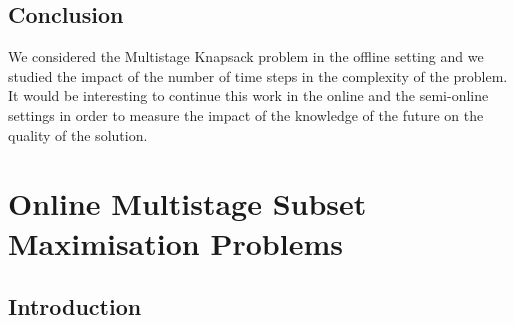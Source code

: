 \documentclass[a4paper]{book}
\begin{document}
\section{Conclusion}
We considered the {\sc Multistage Knapsack} problem in the offline setting and we studied the impact of the number of time steps in the complexity of the problem. It would be interesting to continue this work in the online and the semi-online settings in order to measure the impact of the knowledge of the future on the quality of the solution.








\label{}



\chapter{Online Multistage Subset Maximisation Problems}

\section{Introduction}
\end{document}

